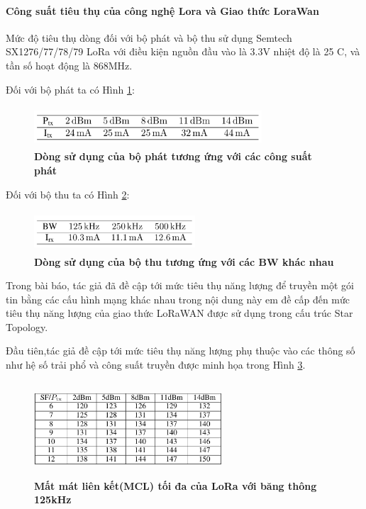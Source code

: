\documentclass{article} %
\begin{document}
	\paragraph{Công suất tiêu thụ của công nghệ Lora và Giao thức LoraWan}\mbox{}
	
	Mức độ tiêu thụ dòng đối với bộ phát và bộ thu sử dụng Semtech SX1276/77/78/79 LoRa với điều kiện nguồn đầu vào là 3.3V nhiệt độ là 25 \textdegree C, và tần số  hoạt động là 868MHz.
	
	Đối với bộ phát ta có Hình \ref{table2}:
	
	\begin{figure}[!ht]
		\centering
		\includegraphics[width=8.5cm,height=1.5cm]{Images/table2.png}
		\caption[Dòng sử dụng của bộ phát tương ứng với các công suất phát\cite{ochoa2017evaluating}]{\bfseries \fontsize{12pt}{0pt}\selectfont Dòng sử dụng của bộ phát tương ứng với các công suất phát \cite{ochoa2017evaluating}}
		\label{table2}
	\end{figure}
	
	Đối với bộ thu ta có Hình \ref{table3}:
	\begin{figure}[!ht]
		\centering
		\includegraphics[width=6cm,height=1.5cm]{Images/table3.png}
		\caption[Dòng sử dụng của bộ thu tương ứng với các BW khác nhau \cite{ochoa2017evaluating}]{\bfseries \fontsize{12pt}{0pt}\selectfont Dòng sử dụng của bộ thu tương ứng với các BW khác nhau \cite{ochoa2017evaluating}}
		\label{table3}
	\end{figure}
	
	Trong bài báo\cite{ochoa2017evaluating}, tác giả đã đề cập tới mức tiêu thụ năng lượng để truyền một gói tin bằng các cấu hình mạng khác nhau trong nội dung này em đề cấp đến mức tiêu thụ năng lượng của giao thức LoRaWAN được sử dụng trong cấu trúc Star Topology. 
	
	Đầu tiên,tác giả đề cập tới mức tiêu thụ năng lượng phụ thuộc vào các thông số như hệ số trải phổ và công suất truyền được minh họa trong Hình \ref{125lost}.
	
	\begin{figure}[!ht]
		\centering
		\includegraphics[width=7cm,height=3.5cm]{Images/125lost.png}
		\caption[Mất mát liên kết(MCL) tối đa của LoRa với băng thông 125kHz\cite{ochoa2017evaluating}]{\bfseries \fontsize{12pt}{0pt}\selectfont Mất mát liên kết(MCL) tối đa của LoRa với băng thông 125kHz\cite{ochoa2017evaluating}}
		\label{125lost}
	\end{figure}
	
\end{document}

